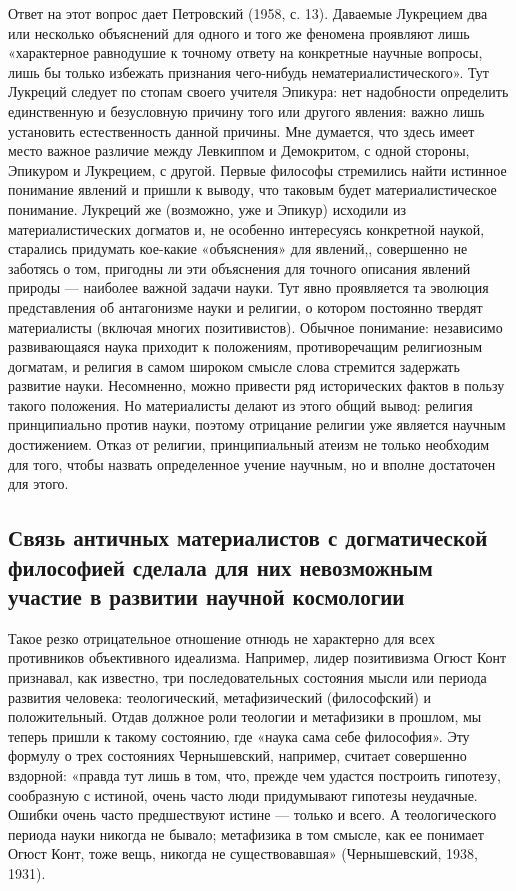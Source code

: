 Ответ на этот вопрос дает Петровский (1958, с. 13). Даваемые Лукрецием
два или несколько объяснений для одного и того же феномена проявляют
лишь «характерное равнодушие к точному ответу на конкретные научные
вопросы, лишь бы только избежать признания чего-нибудь
нематериалистического». Тут Лукреций следует по стопам своего учителя
Эпикура: нет надобности определить единственную и безусловную причину
того или другого явления: важно лишь установить естественность данной
причины. Мне думается, что здесь имеет место важное различие между
Левкиппом и Демокритом, с одной стороны, Эпикуром и Лукрецием, с
другой. Первые философы стремились найти истинное понимание явлений и
пришли к выводу, что таковым будет материалистическое понимание.
Лукреций же (возможно, уже и Эпикур) исходили из материалистических
догматов и, не особенно интересуясь конкретной наукой, старались
придумать кое-какие «объяснения» для явлений,, совершенно не заботясь
о том, пригодны ли эти объяснения для точного описания явлений природы
--- наиболее важной задачи науки. Тут явно проявляется та эволюция
представления об антагонизме науки и религии, о котором постоянно
твердят материалисты (включая многих позитивистов). Обычное понимание:
независимо развивающаяся наука приходит к положениям, противоречащим
религиозным догматам, и религия в самом широком смысле слова стремится
задержать развитие науки. Несомненно, можно привести ряд исторических
фактов в пользу такого положения. Но материалисты делают из этого
общий вывод: религия принципиально против науки, поэтому отрицание
религии уже является научным достижением. Отказ от религии,
принципиальный атеизм не только необходим для того, чтобы назвать
определенное учение научным, но и вполне достаточен для этого.

\subsection{Связь античных материалистов с догматической философией
сделала для них невозможным участие в развитии научной космологии}

Такое резко отрицательное отношение отнюдь не характерно для всех
противников объективного идеализма. Например, лидер позитивизма Огюст
Конт признавал, как известно, три последовательных состояния мысли или
периода развития человека: теологический, метафизический (философский)
и положительный. Отдав должное роли теологии и метафизики в прошлом,
мы теперь пришли к такому состоянию, где «наука сама себе философия».
Эту формулу о трех состояниях Чернышевский, например, считает
совершенно вздорной: «правда тут лишь в том, что, прежде чем удастся
построить гипотезу, сообразную с истиной, очень часто люди придумывают
гипотезы неудачные. Ошибки очень часто предшествуют истине --- только
и всего. А теологического периода науки никогда не бывало; метафизика
в том смысле, как ее понимает Огюст Конт, тоже вещь, никогда не
существовавшая» (Чернышевский, 1938, 1931).

